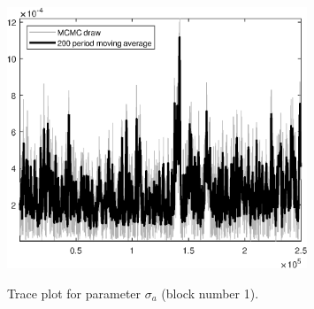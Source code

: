 \begin{figure}[H]
\centering
  \includegraphics[width=0.8\textwidth]{BRS_imp_mobility/graphs/TracePlot_sigma_a_blck_1}\\
    \caption{Trace plot for parameter ${\sigma_a}$ (block number 1).}
\end{figure}
